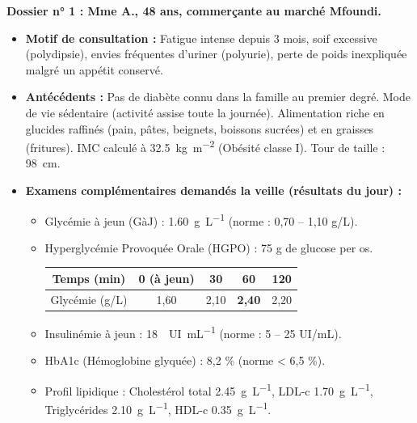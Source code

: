\documentclass[11pt]{article}
\begin{document}
\vspace{1em}
\noindent\textbf{Dossier n° 1 : Mme A., 48 ans, commerçante au marché Mfoundi.}
\begin{itemize}
    \item \textbf{Motif de consultation :} Fatigue intense depuis 3 mois, soif excessive (polydipsie), envies fréquentes d'uriner (polyurie), perte de poids inexpliquée malgré un appétit conservé.
    \item \textbf{Antécédents :} Pas de diabète connu dans la famille au premier degré. Mode de vie sédentaire (activité assise toute la journée). Alimentation riche en glucides raffinés (pain, pâtes, beignets, boissons sucrées) et en graisses (fritures). IMC calculé à \SI{32,5}{kg.m^{-2}} (Obésité classe I). Tour de taille : \SI{98}{cm}.
    \item \textbf{Examens complémentaires demandés la veille (résultats du jour) :}
    \begin{itemize}
        \item Glycémie à jeun (GàJ) : \SI{1,60}{g.L^{-1}} (norme : 0,70 -- 1,10 g/L).
        \item Hyperglycémie Provoquée Orale (HGPO) : 75 g de glucose per os.
        \begin{center}
            \begin{tabular}{|c|c|c|c|c|}\hline
                Temps (min) & 0 (à jeun) & 30 & 60 & 120 \\ \hline
                Glycémie (g/L) & 1,60 & 2,10 & \textbf{2,40} & 2,20 \\ \hline
            \end{tabular}
        \end{center}
        \item Insulinémie à jeun : \SI{18}{\mu UI.mL^{-1}} (norme : 5 -- 25 \mu UI/mL).
        \item HbA1c (Hémoglobine glyquée) : 8,2 \% (norme < 6,5 \%).
        \item Profil lipidique : Cholestérol total \SI{2,45}{g.L^{-1}}, LDL-c \SI{1,70}{g.L^{-1}}, Triglycérides \SI{2,10}{g.L^{-1}}, HDL-c \SI{0,35}{g.L^{-1}}.
    \end{itemize}
\end{itemize}
\end{document}
